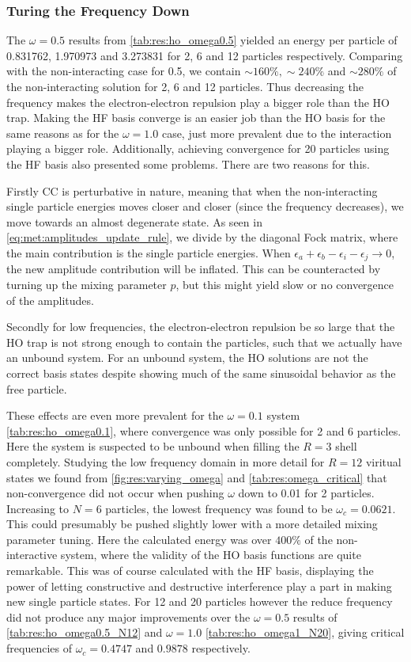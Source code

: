 \subsubsection{Turing the Frequency Down}
The $\omega = 0.5$ results from \cref{tab:res:ho_omega0.5} yielded an energy per particle of 0.831762, 1.970973 and 3.273831 for 2, 6 and 12 particles respectively. Comparing with the non-interacting case for 0.5, we contain $\sim 160\%,\sim 240\%$ and $\sim 280\%$ of the non-interacting solution for 2, 6 and 12 particles. Thus decreasing the frequency makes the electron-electron repulsion play a bigger role than the HO trap. Making the HF basis converge is an easier job than the HO basis for the same reasons as for the $\omega = 1.0$ case, just more prevalent due to the interaction playing a bigger role. Additionally, achieving convergence for 20 particles using the HF basis also presented some problems. There are two reasons for this.

Firstly CC is perturbative in nature, meaning that when the non-interacting single particle energies moves closer and closer (since the frequency decreases), we move towards an almost degenerate state. As seen in \cref{eq:met:amplitudes_update_rule}, we divide by the diagonal Fock matrix, where the main contribution is the single particle energies. When  $\epsilon_a + \epsilon_b - \epsilon_i - \epsilon_j \rightarrow 0$, the new amplitude contribution will be inflated. This can be counteracted by turning up the mixing parameter $p$, but this might yield slow or no convergence of the amplitudes.

Secondly for low frequencies, the electron-electron repulsion be so large that the HO trap is not strong enough to contain the particles, such that we actually have an unbound system. For an unbound system, the HO solutions are not the correct basis states despite showing much of the same sinusoidal behavior as the free particle.   

These effects are even more prevalent for the $\omega = 0.1$ system \cref{tab:res:ho_omega0.1}, where convergence was only possible for 2 and 6 particles. Here the system is suspected to be unbound when filling the $R=3$ shell completely. Studying the low frequency domain in more detail for $R=12$ viritual states we found from \cref{fig:res:varying_omega} and \cref{tab:res:omega_critical} that non-convergence did not occur when pushing $\omega$ down to 0.01 for 2 particles. Increasing to $N = 6$ particles, the lowest frequency was found to be $\omega_c = 0.0621$. This could presumably be pushed slightly lower with a more detailed mixing parameter tuning. Here the calculated energy was over $400\%$ of the non-interactive system, where the validity of the HO basis functions are quite remarkable. This was of course calculated with the HF basis, displaying the power of letting constructive and destructive interference play a part in making new single particle states. For 12 and 20 particles however the reduce frequency did not produce any major improvements over the $\omega = 0.5$ results of \cref{tab:res:ho_omega0.5_N12} and $\omega = 1.0$ \cref{tab:res:ho_omega1_N20}, giving critical frequencies of $\omega_c = 0.4747$ and $0.9878$ respectively.  